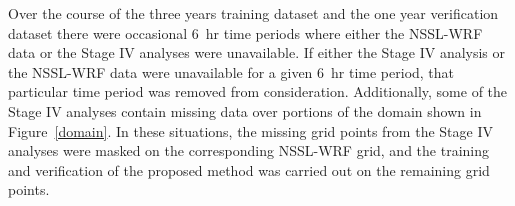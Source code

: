 Over the course of the three years training dataset and the one year verification dataset there were occasional \mbox{6 hr} time periods where either the NSSL-WRF data or the Stage IV analyses were unavailable.
If either the Stage IV analysis or the NSSL-WRF data were unavailable for a given \mbox{6 hr} time period, that particular time period was removed from consideration.
Additionally, some of the Stage IV analyses contain missing data over portions of the domain shown in \mbox{Figure \ref{domain}}.
In these situations, the missing grid points from the Stage IV analyses were masked on the corresponding NSSL-WRF grid, and the training and verification of the proposed method was carried out on the remaining grid points.
